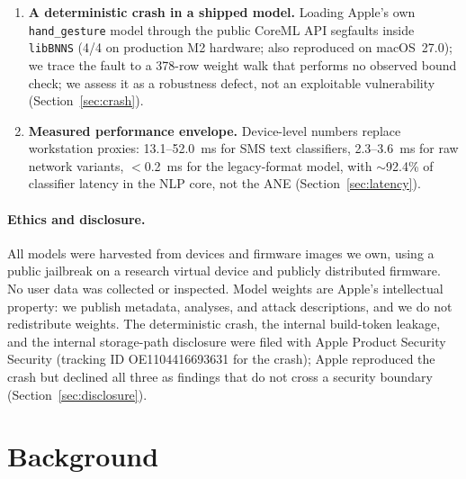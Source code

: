 \documentclass[letterpaper,twocolumn,10pt]{article}
\begin{document}
\begin{enumerate}
    On the test device, a 16-byte edit to one weight file flips 7 of 8
    probe inputs (the eighth becomes a 50/50 tie) of the system's
    interaction-prediction model; ten further bundles ship
    \texttt{isUpdatable=1} hooks that treat runtime weight replacement as an
    intended interface, unseparated from tampering
    (Sections~\ref{sec:poisoning} and~\ref{sec:updatables}).
    \item \textbf{A deterministic crash in a shipped model.}
    Loading Apple's own \texttt{hand\_gesture} model through the public
    CoreML API segfaults inside \texttt{libBNNS} (4/4 on production M2
    hardware; also reproduced on macOS~27.0); we trace the fault to a 378-row weight walk
    that performs no observed bound check; we assess it as a
    robustness defect, not an exploitable vulnerability
    (Section~\ref{sec:crash}).
    \item \textbf{Measured performance envelope.}
    Device-level numbers replace workstation proxies: 13.1--52.0~ms for SMS
    text classifiers, 2.3--3.6~ms for raw network variants, $<$0.2~ms for
    the legacy-format model, with $\sim$92.4\% of classifier latency in the
    NLP core, not the ANE (Section~\ref{sec:latency}).
\end{enumerate}

\paragraph{Ethics and disclosure.}
All models were harvested from devices and firmware images we own, using a
public jailbreak on a research virtual device and publicly distributed
firmware.
No user data was collected or inspected.
Model weights are Apple's intellectual property: we publish metadata,
analyses, and attack descriptions, and we do not redistribute weights.
The deterministic crash, the internal build-token leakage, and the internal
storage-path disclosure were filed with Apple Product Security Security (tracking ID
OE1104416693631 for the crash); Apple reproduced the crash but declined all
three as findings that do not cross a security boundary
(Section~\ref{sec:disclosure}).

\section{Background}
\label{sec:background}
\end{document}
